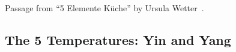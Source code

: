 \documentclass[../main.tex]{subfiles}
\begin{document}
Passage from ``5 Elemente K\"uche'' by Ursula Wetter~\cite{5Elemente}.

\subsection{The 5 Temperatures: Yin and Yang}
\end{document}

